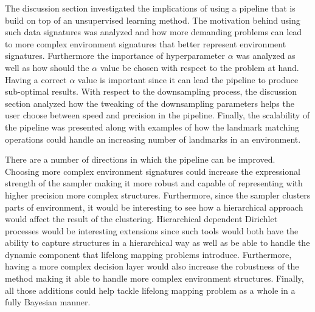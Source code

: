 \documentclass [twoside,hidelinks]{article}
\begin{document}
 The discussion section investigated the implications of using a pipeline that is build on top of an unsupervised learning method. 
 The motivation behind using such data signatures was analyzed and how more demanding problems can lead to more complex environment signatures that better represent environment signatures.
 Furthermore the importance of hyperparameter $\alpha$ was analyzed as well as how should the $\alpha$ value be chosen with respect to the problem at hand. Having a correct $\alpha$ value is important since it can lead the pipeline to produce sub-optimal results. 
 With respect to the downsampling process, the discussion section analyzed how the tweaking of the downsampling parameters helps the user choose between speed and precision in the pipeline. 
 Finally, the scalability of the pipeline was presented along with examples of how the landmark matching operations could handle an increasing number of landmarks in an environment.

There are a number of directions in which the pipeline can be improved.
Choosing more complex environment signatures could increase the expressional strength of the sampler making it more robust and capable of representing with higher precision more complex structures.
Furthermore, since the sampler clusters parts of environment, it would be interesting to see how a hierarchical approach would affect the result of the clustering.
Hierarchical dependent Dirichlet processes would be interesting extensions since such tools would both have the ability to capture structures in a hierarchical way as well as be able to handle the dynamic component that lifelong mapping problems introduce. 
Furthermore, having a more complex decision layer would also increase the robustness of the method making it able to handle more complex environment structures. 
Finally, all those additions could help tackle lifelong mapping problem as a whole in a fully Bayesian manner.


\end{document}
